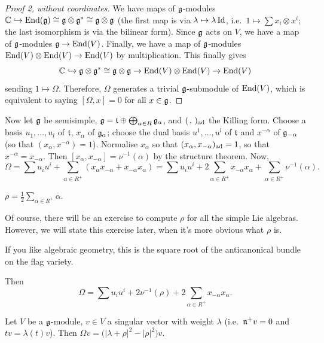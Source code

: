 \begin{proof}[Proof 2, without coordinates]
We have maps of $\mathfrak{g}$-modules
$\mathbb{C} \hookrightarrow \operatorname{End}(\mathfrak{g}) \cong \mathfrak{g} \otimes \mathfrak{g}^* \cong \mathfrak{g} \otimes \mathfrak{g}$ (the
first map is via $\lambda \mapsto \lambda\operatorname{Id}$, i.e.\
$1 \mapsto \sum x_i \otimes x^i$; the last isomorphism is via the bilinear
form). Since $\mathfrak{g}$ acts on $V$, we have a map of $\mathfrak{g}$-modules
$\mathfrak{g} \to \operatorname{End}(V)$. Finally, we have a map of $\mathfrak{g}$-modules
$\operatorname{End}(V) \otimes \operatorname{End}(V) \to \operatorname{End}(V)$ by multiplication. This finally gives
\[
  \mathbb{C} \hookrightarrow \mathfrak{g} \otimes \mathfrak{g}^* \cong \mathfrak{g} \otimes \mathfrak{g} \to \operatorname{End}(V) \otimes \operatorname{End}(V) \to \operatorname{End}(V)
\]
sending $1 \mapsto \Omega$. Therefore, $\Omega$ generates a trivial
$\mathfrak{g}$-submodule of $\operatorname{End}(V)$, which is equivalent to saying $[\Omega, x] = 0$
for all $x \in \mathfrak{g}$.
\end{proof}

Now let $\mathfrak{g}$ be semisimple, $\mathfrak{g} = \mathfrak{t} \oplus \bigoplus_{\alpha \in R} \mathfrak{g}_\alpha$,
and $(\,,\,)_{\operatorname{ad}}$ the Killing form. Choose a basis $u_1, \dots, u_l$ of
$\mathfrak{t}$, $x_\alpha$ of $\mathfrak{g}_\alpha$; choose the dual basis $u^1, \dots, u^l$ of
$\mathfrak{t}$ and $x^{-\alpha}$ of $\mathfrak{g}_{-\alpha}$ (so that $(x_\alpha, x^{-\alpha}) = 1$).
Normalise $x_\alpha$ so that $(x_\alpha, x_{-\alpha})_{\operatorname{ad}} = 1$, so that
$x^{-\alpha} = x_{-\alpha}$. Then $[x_\alpha, x_{-\alpha}] = \nu^{-1}(\alpha)$
by the structure theorem. Now,
\[
  \Omega = \sum u_iu^i + \sum_{\alpha \in R^+} (x_\alpha x_{-\alpha} + x_{-\alpha}x_\alpha)
         = \sum u_iu^i + 2\sum_{\alpha \in R^+} x_{-\alpha}x_\alpha + \sum_{\alpha \in R^+} \nu^{-1}(\alpha).
\]

\begin{definition}
$\rho = \frac12 \sum_{\alpha \in R^+} \alpha$.
\end{definition}

\begin{remark}
Of course, there will be an exercise to compute $\rho$ for all the simple Lie
algebras. However, we will state this exercise later, when it's more obvious
what $\rho$ is.
\end{remark}

\begin{remark}
If you like algebraic geometry, this is the square root of the anticanonical
bundle on the flag variety.
\end{remark}

Then
\[
  \Omega = \sum u_iu^i + 2\nu^{-1}(\rho) + 2\sum_{\alpha \in R^+} x_{-\alpha}x_\alpha.
\]

\begin{lemma}
Let $V$ be a $\mathfrak{g}$-module, $v \in V$ a singular vector with weight $\lambda$
(i.e.\ $\mathfrak{n}^+v = 0$ and $tv = \lambda(t)v$). Then
$\Omega v = \bigl(|\lambda + \rho|^2 - |\rho|^2\bigr)v$.
\end{lemma}

